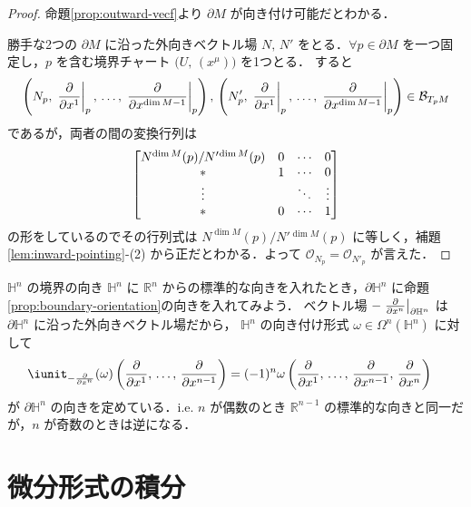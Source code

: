 \documentclass[geometry_main]{subfiles}
\begin{document}
\begin{proof}
	命題\ref{prop:outward-vecf}より $\partial M$ が向き付け可能だとわかる．

	勝手な2つの $\partial M$ に沿った外向きベクトル場 $N,\, N'$ をとる．$\forall p \in \partial M$ を一つ固定し，$p$ を含む境界チャート $\bigl( U,\, (x^\mu) \bigr)$ を1つとる．
	すると
	\begin{align}
		\left(N_p,\, \eval{\pdv{}{x^1}}_p,\, \dots,\, \eval{\pdv{}{x^{\dim M -1}}}_p \right),\, \left(N'_p,\, \eval{\pdv{}{x^1}}_p,\, \dots,\, \eval{\pdv{}{x^{\dim M -1}}}_p \right) \in \mathcal{B}_{T_p M}
	\end{align}
	であるが，両者の間の変換行列は
	\begin{align}
		\mqty[
			N^{\dim M}(p)/ N'{}^{\dim M}(p) &0 &\cdots &0 \\
			* &1 &\cdots &0 \\
			\vdots &  &\ddots &\vdots \\
			* &0 &\cdots &1 \\
		]
	\end{align}
	の形をしているのでその行列式は $N^{\dim M}(p)/ N'{}^{\dim M}(p)$ に等しく，補題\ref{lem:inward-pointing}-(2) から正だとわかる．よって $\mathcal{O}_{N_p} = \mathcal{O}_{N'_p}$ が言えた．
\end{proof}

\begin{myexample}[label=ex:orientation-of-halfplane]{$\mathbb{H}^n$ の境界の向き}
	$\mathbb{H}^n$ に $\mathbb{R}^n$ からの標準的な向きを入れたとき，$\partial \mathbb{H}^n$ に命題\ref{prop:boundary-orientation}の向きを入れてみよう．
	ベクトル場 $-\eval{\pdv{}{x^n}}_{\partial \mathbb{H}^n}$ は $\partial \mathbb{H}^n$ に沿った外向きベクトル場だから，
	$\mathbb{H}^n$ の向き付け形式 $\omega \in \Omega^n(\mathbb{H}^n)$ に対して
	\begin{align}
		\iunit_{-\pdv{}{x^n}}(\omega) \left( \pdv{}{x^1},\, \dots,\, \pdv{}{x^{n-1}} \right) 
		&= (-1)^{n} \omega \left( \pdv{}{x^1},\, \dots,\, \pdv{}{x^{n-1}},\, \pdv{}{x^n} \right) 
	\end{align}
	が $\partial \mathbb{H}^n$ の向きを定めている．i.e. $n$ が偶数のとき $\mathbb{R}^{n-1}$ の標準的な向きと同一だが，$n$ が奇数のときは逆になる．
\end{myexample}


\section{微分形式の積分}
\end{document}
